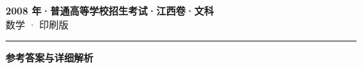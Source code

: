 \documentclass[zihao=5, a4paper]{ctexart}
\begin{document}
\begin{center}
  {\Large\bfseries 2008 年·普通高等学校招生考试·江西卷·文科}\\[4pt]
  {\large 数学 · 印刷版}
\end{center}
\medskip
{}

\par\bigskip\hrule\bigskip
{}
\begin{center}{\large\bfseries 参考答案与详细解析}\end{center}
\smallskip

\end{document}
